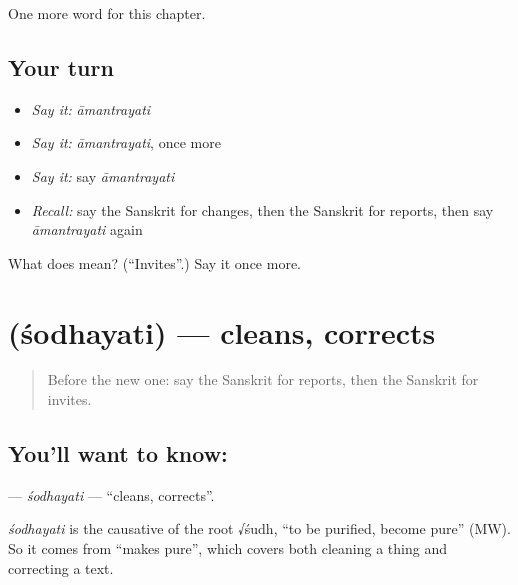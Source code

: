 \begin{grammarlens}[title={What you've built}]
One more word for this chapter.
\end{grammarlens}

\subsection*{Your turn}
\begin{itemize}
\raggedright
  \item \emph{Say it:} \emph{āmantrayati}
  \item \emph{Say it:} \emph{āmantrayati}, once more
  \item \emph{Say it:} say \emph{āmantrayati}
  \item \emph{Recall:} say the Sanskrit for changes, then the Sanskrit for reports, then say \emph{āmantrayati} again
\end{itemize}

\begin{tcolorbox}[breakable,colback=teal!4,colframe=teal!35!black,title={Before you move on}]
What does  mean? (\textquotedblleft{}Invites\textquotedblright{}.) Say it once more.
\end{tcolorbox}
\section[\texorpdfstring{\sk{शोधयति} (śodhayati)}{शोधयति (śodhayati)}]{ (śodhayati) — cleans, corrects}

\label{lesson:SA-C176-sodhayati}



\begin{quote}
Before the new one: say the Sanskrit for reports, then the Sanskrit for invites.
\end{quote}

\subsection*{You'll want to know: }
\textbf{} — \emph{śodhayati} — \textquotedblleft{}cleans, corrects\textquotedblright{}.

\begin{cousinweb}
\emph{śodhayati} is the causative of the root √śudh, \textquotedblleft{}to be purified, become pure\textquotedblright{} (MW). So it comes from \textquotedblleft{}makes pure\textquotedblright{}, which covers both cleaning a thing and correcting a text.
\end{cousinweb}

